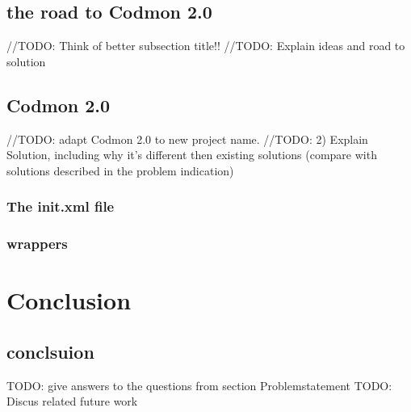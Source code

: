 \documentclass[a4paper,10pt]{scrartcl}
\newcommand{\project}{Codmon 2.0}
\begin{document}
\subsection{the road to \project{}}
//TODO: Think of better subsection title!!
//TODO: Explain ideas and road to solution

\subsection{Codmon 2.0}
//TODO: adapt Codmon 2.0 to new project name.
//TODO: 2) Explain Solution, including why it's different then existing solutions (compare with solutions described in the problem indication)

\subsubsection{The init.xml file}
\label{subsec:init}

\subsubsection{wrappers}
\label{subsec:wrappers}

\newpage
\section{Conclusion}
\subsection{conclsuion}
TODO: give answers to the questions from section Problemstatement
TODO: Discus related future work
\newpage


\end{document}
